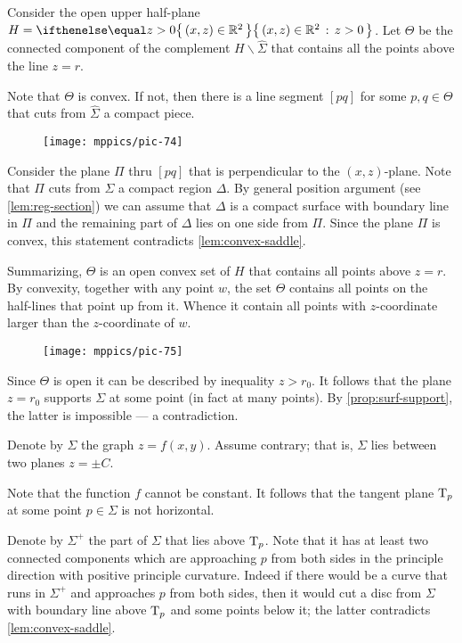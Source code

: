 Consider the open upper half-plane $H=\set{(x,z)\in \RR^2}{z> 0}$. 
Let $\Theta$ be the connected component of the complement $H\backslash \hat \Sigma$ that contains all the points above the line $z=r$.

Note that $\Theta$ is convex.
If not, then there is a line segment $[pq]$ for some $p,q\in \Theta$ that cuts from $\hat\Sigma$ a compact piece.
\begin{figure}[h!]
\vskip-0mm
\centering
\texttt{[image: mppics/pic-74]}
\vskip0mm
\end{figure}
Consider the plane $\Pi$ thru $[pq]$ that is perpendicular to the $(x,z)$-plane.
Note that $\Pi$ cuts from $\Sigma$ a compact region $\Delta$.
By general position argument (see \ref{lem:reg-section}) 
we can assume that $\Delta$ is a compact surface with boundary line in $\Pi$ and the remaining part of $\Delta$ lies on one side from $\Pi$.
Since the plane $\Pi$ is convex, this statement contradicts \ref{lem:convex-saddle}.

Summarizing, $\Theta$ is an open convex set of $H$ that contains all points above $z=r$.
By convexity, together with any point $w$, the set $\Theta$ contains all points on the half-lines that point up from it. 
Whence it contain all points with $z$-coordinate larger than the $z$-coordinate of $w$.
\begin{figure}[h!]
\vskip-0mm
\centering
\texttt{[image: mppics/pic-75]}
\vskip0mm
\end{figure}
Since $\Theta$ is open it can be described by inequality $z>r_0$.
It follows that the plane $z=r_0$ supports $\Sigma$ at some point (in fact at many points).
By \ref{prop:surf-support}, the latter is impossible --- a contradiction.
\qeds

Denote by $\Sigma$ the graph $z=f(x,y)$.
Assume contrary; that is, $\Sigma$ lies between two planes $z=\pm C$.

Note that the function $f$ cannot be constant.
It follows that the tangent plane $\mathrm{T}_p$ at some point $p\in\Sigma$ is not horizontal.

Denote by $\Sigma^+$ the part of $\Sigma$ that lies above $\mathrm{T}_p$.
Note that it has at least two connected components which are approaching $p$ from both sides 
in the principle direction with positive principle curvature.
Indeed if there would be a curve that runs in $\Sigma^+$ and approaches $p$ from both sides, then it would cut a disc from $\Sigma$ with boundary line above $\mathrm{T}_p$ and some points below it;
the latter contradicts \ref{lem:convex-saddle}.

